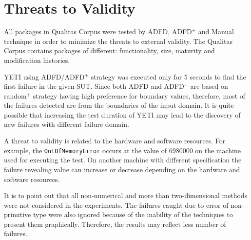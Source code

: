 


\section{Threats to Validity} \label{sec:threat}
All packages in Qualitas Corpus were tested by ADFD, ADFD$^+$ and Manual technique in order to minimize the threats to external validity. The Qualitas Corpus contains packages of different: functionality, size, maturity and modification histories.

YETI using ADFD/ADFD$^+$ strategy was executed only for 5 seconds to find the first failure in the given SUT. Since both ADFD and ADFD$^+$ are based on random$^+$ strategy having high preference for boundary values, therefore, most of the failures detected are from the boundaries of the input domain. It is quite possible that increasing the test duration of YETI may lead to the discovery of new failures with different failure domain.

A threat to validity is related to the hardware and software resources. For example, the \verb+OutOfMemoryError+ occurs at the value of 6980000 on the machine used for executing the test. On another machine with different specification the failure revealing value can increase or decrease depending on the hardware and software resources.

It is to point out that all non-numerical and more than two-dimensional methods were not considered in the experiments. The failures caught due to error of non-primitive type were also ignored because of the inability of the techniques to present them graphically. Therefore, the results may reflect less number of failures.












